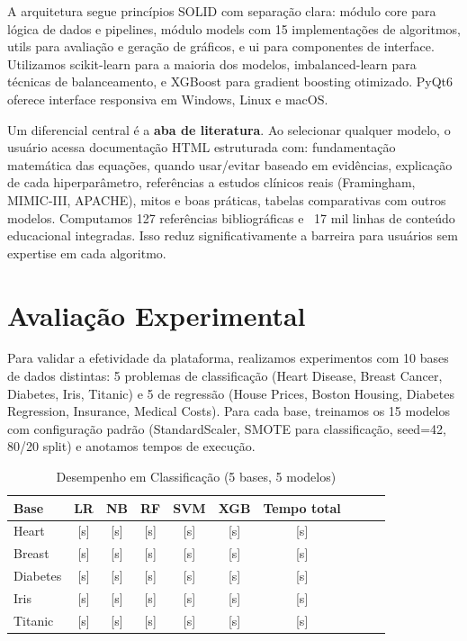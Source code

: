\documentclass[12pt]{article}
\begin{document}
A arquitetura segue princípios SOLID com separação clara: módulo core para lógica de dados e pipelines, módulo models com 15 implementações de algoritmos, utils para avaliação e geração de gráficos, e ui para componentes de interface. Utilizamos scikit-learn para a maioria dos modelos, imbalanced-learn para técnicas de balanceamento, e XGBoost para gradient boosting otimizado. PyQt6 oferece interface responsiva em Windows, Linux e macOS.

Um diferencial central é a \textbf{aba de literatura}. Ao selecionar qualquer modelo, o usuário acessa documentação HTML estruturada com: fundamentação matemática das equações, quando usar/evitar baseado em evidências, explicação de cada hiperparâmetro, referências a estudos clínicos reais (Framingham, MIMIC-III, APACHE), mitos e boas práticas, tabelas comparativas com outros modelos. Computamos 127 referências bibliográficas e ~17 mil linhas de conteúdo educacional integradas. Isso reduz significativamente a barreira para usuários sem expertise em cada algoritmo.


\section{Avaliação Experimental}

Para validar a efetividade da plataforma, realizamos experimentos com 10 bases de dados distintas: 5 problemas de classificação (Heart Disease, Breast Cancer, Diabetes, Iris, Titanic) e 5 de regressão (House Prices, Boston Housing, Diabetes Regression, Insurance, Medical Costs). Para cada base, treinamos os 15 modelos com configuração padrão (StandardScaler, SMOTE para classificação, seed=42, 80/20 split) e anotamos tempos de execução.

\begin{table}[H]
\caption{Desempenho em Classificação (5 bases, 5 modelos)}
\label{tab:classification}
\centering
\small
\begin{tabular}{|l|c|c|c|c|c|c|c|c|c|}
\hline
\textbf{Base} & \textbf{LR} & \textbf{NB} & \textbf{RF} & \textbf{SVM} & \textbf{XGB} & \textbf{Tempo total} \\
\hline
Heart & [s] & [s] & [s] & [s] & [s] & [s] \\
\hline
Breast & [s] & [s] & [s] & [s] & [s] & [s] \\
\hline
Diabetes & [s] & [s] & [s] & [s] & [s] & [s] \\
\hline
Iris & [s] & [s] & [s] & [s] & [s] & [s] \\
\hline
Titanic & [s] & [s] & [s] & [s] & [s] & [s] \\
\hline
\end{tabular}
\end{table}
\end{document}

